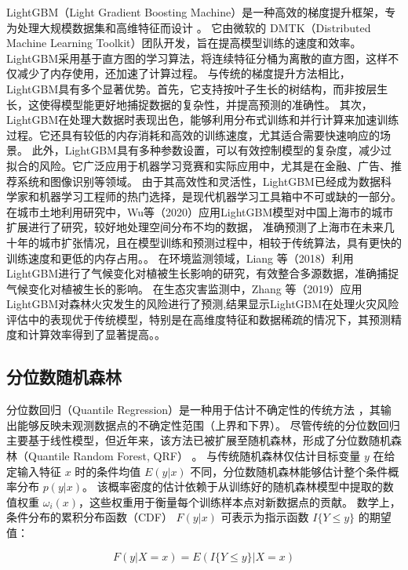 \documentclass[AutoFakeBold]{LZUThesis-PgD&PhD}
\begin{document}
	LightGBM（Light Gradient Boosting Machine）是一种高效的梯度提升框架，专为处理大规模数据集和高维特征而设计 \cite{ke2017lightgbm}。
	它由微软的 DMTK（Distributed Machine Learning Toolkit）团队开发，旨在提高模型训练的速度和效率。
	LightGBM采用基于直方图的学习算法，将连续特征分桶为离散的直方图，这样不仅减少了内存使用，还加速了计算过程。
	与传统的梯度提升方法相比，LightGBM具有多个显著优势。首先，它支持按叶子生长的树结构，而非按层生长，这使得模型能更好地捕捉数据的复杂性，并提高预测的准确性。
	其次，LightGBM在处理大数据时表现出色，能够利用分布式训练和并行计算来加速训练过程。它还具有较低的内存消耗和高效的训练速度，尤其适合需要快速响应的场景。
	此外，LightGBM具有多种参数设置，可以有效控制模型的复杂度，减少过拟合的风险。它广泛应用于机器学习竞赛和实际应用中，尤其是在金融、广告、推荐系统和图像识别等领域。
	由于其高效性和灵活性，LightGBM已经成为数据科学家和机器学习工程师的热门选择，是现代机器学习工具箱中不可或缺的一部分。
	在城市土地利用研究中，Wu等（2020）应用LightGBM模型对中国上海市的城市扩展进行了研究，较好地处理空间分布不均的数据，
	准确预测了上海市在未来几十年的城市扩张情况，且在模型训练和预测过程中，相较于传统算法，具有更快的训练速度和更低的内存占用。\cite{wu2020}。
	在环境监测领域，Liang 等（2018）利用LightGBM进行了气候变化对植被生长影响的研究，有效整合多源数据，准确捕捉气候变化对植被生长的影响\cite{liang2018}。
	在生态灾害监测中，Zhang 等（2019）应用LightGBM对森林火灾发生的风险进行了预测,结果显示LightGBM在处理火灾风险评估中的表现优于传统模型，特别是在高维度特征和数据稀疏的情况下，其预测精度和计算效率得到了显著提高。\cite{zhang2019}。
	
	\subsection{分位数随机森林}
	
	分位数回归（Quantile Regression）是一种用于估计不确定性的传统方法 \cite{koenker2005quantile}，其输出能够反映未观测数据点的不确定性范围（上界和下界）。
	尽管传统的分位数回归主要基于线性模型，但近年来，该方法已被扩展至随机森林，形成了分位数随机森林（Quantile Random Forest, QRF） \cite{meinshausen2006quantile}。
	与传统随机森林仅估计目标变量 \( y \) 在给定输入特征 \( x \) 时的条件均值 \( E(y|x) \) 不同，分位数随机森林能够估计整个条件概率分布 \( p(y|x) \)。
	该概率密度的估计依赖于从训练好的随机森林模型中提取的数值权重 \( \omega_i (x) \)，这些权重用于衡量每个训练样本点对新数据点的贡献。  
	数学上，条件分布的累积分布函数（CDF） \( F(y|x) \) 可表示为指示函数 \( I\{Y \leq y\} \) 的期望值：
	
	\begin{equation}
		F(y|X = x) = E (I\{Y \leq y\} |X = x)
	\end{equation}
	
\end{document}
